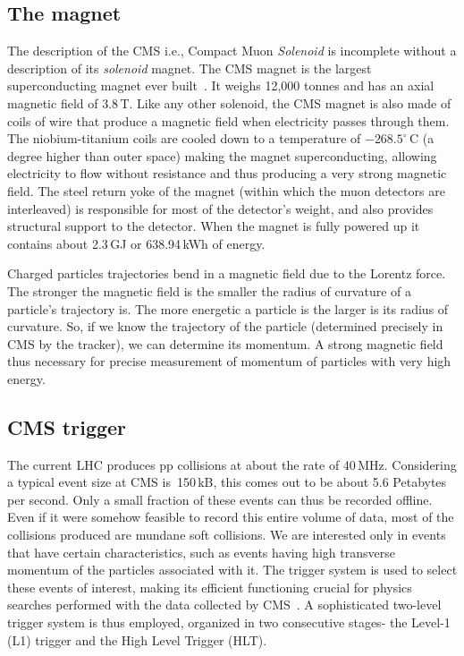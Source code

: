 \subsection{The magnet}
\label{CMS magnet}
The description of the CMS i.e., Compact Muon \textit{Solenoid} is incomplete without a description of its \textit{solenoid} magnet. The CMS magnet is the largest superconducting magnet ever built~\cite{magnet}. It weighs 12,000 tonnes and has an axial magnetic field of 3.8\,T. Like any other solenoid, the CMS magnet is also made of coils of wire that produce a magnetic field when electricity passes through them. The niobium-titanium coils are cooled down to a temperature of $-268.5^{\circ}\,\mathrm{C}$ (a degree higher than outer space) making the magnet superconducting, allowing electricity to flow without resistance and thus producing a very strong magnetic field. The steel return yoke of the magnet (within which the muon detectors are interleaved) is responsible for most of the detector's weight, and also provides structural support to the detector. When the magnet is fully powered up it contains about 2.3\,GJ or 638.94\,kWh of energy.

Charged particles trajectories bend in a magnetic field due to the Lorentz force. The stronger the magnetic field is the smaller the radius of curvature of a particle's trajectory is. The more energetic a particle is the larger is its radius of curvature. So, if we know the trajectory of the particle (determined precisely in CMS by the tracker), we can determine its momentum. A strong magnetic field thus necessary for precise measurement of momentum of particles with very high energy.


\subsection{CMS trigger}
\label{trigger}

The current LHC produces pp collisions at about the rate of 40\,MHz. Considering a typical event size at CMS is~150\,kB, this comes out to be about 5.6 Petabytes per second. Only a small fraction of these events can thus be recorded offline. Even if it were somehow feasible to record this entire volume of data,  most of the collisions produced are mundane soft collisions. We are interested only in events that have certain characteristics, such as events having high transverse momentum of the particles associated with it. The trigger system is used to select these events of interest, making its efficient functioning crucial for physics searches performed with the data collected by CMS~\cite{trigger1}. A sophisticated two-level trigger system is thus employed, organized in two consecutive stages- the Level-1 (L1) trigger and the High Level Trigger (HLT).


